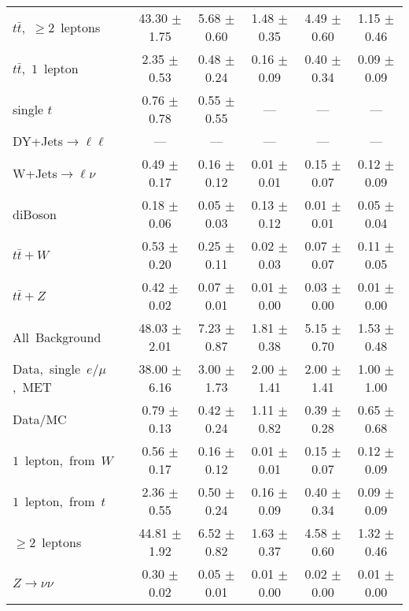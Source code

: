 \documentclass{article}
\begin{document}
\begin{longtable}{|l|c|c|c|c|c|}
$t\bar{t}$,~$\ge2$~leptons & 43.30 $\pm$ 1.75  & 5.68 $\pm$ 0.60  & 1.48 $\pm$ 0.35  & 4.49 $\pm$ 0.60  & 1.15 $\pm$ 0.46 \\* 
$t\bar{t}$,~$1$~lepton & 2.35 $\pm$ 0.53  & 0.48 $\pm$ 0.24  & 0.16 $\pm$ 0.09  & 0.40 $\pm$ 0.34  & 0.09 $\pm$ 0.09 \\* 
single $t$  & 0.76 $\pm$ 0.78  & 0.55 $\pm$ 0.55  & ---  & ---  & --- \\* 
DY+Jets$\rightarrow\ell\ell$  & ---  & ---  & ---  & ---  & --- \\* 
W+Jets$\rightarrow\ell\nu$  & 0.49 $\pm$ 0.17  & 0.16 $\pm$ 0.12  & 0.01 $\pm$ 0.01  & 0.15 $\pm$ 0.07  & 0.12 $\pm$ 0.09 \\* 
diBoson  & 0.18 $\pm$ 0.06  & 0.05 $\pm$ 0.03  & 0.13 $\pm$ 0.12  & 0.01 $\pm$ 0.01  & 0.05 $\pm$ 0.04 \\* 
$t\bar{t}+W$  & 0.53 $\pm$ 0.20  & 0.25 $\pm$ 0.11  & 0.02 $\pm$ 0.03  & 0.07 $\pm$ 0.07  & 0.11 $\pm$ 0.05 \\* 
$t\bar{t}+Z$  & 0.42 $\pm$ 0.02  & 0.07 $\pm$ 0.01  & 0.01 $\pm$ 0.00  & 0.03 $\pm$ 0.00  & 0.01 $\pm$ 0.00 \\* 
\hline \hline 
All~Background  & 48.03 $\pm$ 2.01  & 7.23 $\pm$ 0.87  & 1.81 $\pm$ 0.38  & 5.15 $\pm$ 0.70  & 1.53 $\pm$ 0.48 \\* 
Data,~single~$e/\mu$,~MET  & 38.00 $\pm$ 6.16  & 3.00 $\pm$ 1.73  & 2.00 $\pm$ 1.41  & 2.00 $\pm$ 1.41  & 1.00 $\pm$ 1.00 \\* 
Data/MC  & 0.79 $\pm$ 0.13  & 0.42 $\pm$ 0.24  & 1.11 $\pm$ 0.82  & 0.39 $\pm$ 0.28  & 0.65 $\pm$ 0.68 \\* 
\hline \hline 
$1$~lepton,~from~$W$  & 0.56 $\pm$ 0.17  & 0.16 $\pm$ 0.12  & 0.01 $\pm$ 0.01  & 0.15 $\pm$ 0.07  & 0.12 $\pm$ 0.09 \\* 
$1$~lepton,~from~$t$  & 2.36 $\pm$ 0.55  & 0.50 $\pm$ 0.24  & 0.16 $\pm$ 0.09  & 0.40 $\pm$ 0.34  & 0.09 $\pm$ 0.09 \\* 
$\ge2$~leptons  & 44.81 $\pm$ 1.92  & 6.52 $\pm$ 0.82  & 1.63 $\pm$ 0.37  & 4.58 $\pm$ 0.60  & 1.32 $\pm$ 0.46 \\* 
$Z\rightarrow\nu\nu$  & 0.30 $\pm$ 0.02  & 0.05 $\pm$ 0.01  & 0.01 $\pm$ 0.00  & 0.02 $\pm$ 0.00  & 0.01 $\pm$ 0.00 \\* 
\hline 
\end{longtable} 

 
 
 
 
\pagebreak 

 
 
\end{document}
